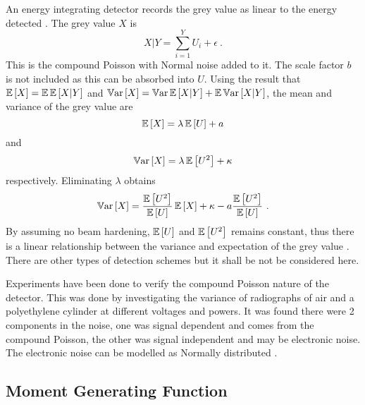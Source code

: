 An energy integrating detector records the grey value as linear to the energy detected \citep{whiting2006properties}. The grey value $X$ is
\begin{equation}
X|Y = \sum_{i=1}^Y U_i + \epsilon \ .
\end{equation}
This is the compound Poisson with Normal noise added to it. The scale factor $b$ is not included as this can be absorbed into $U$. Using the result that $\operatorname{\mathbb{E}}\left[X\right]=\operatorname{\mathbb{E}}\operatorname{\mathbb{E}}\left[X|Y\right]$ and $\operatorname{\mathbb{V}ar}\left[X\right] = \operatorname{\mathbb{V}ar}\operatorname{\mathbb{E}}\left[X|Y\right] + \operatorname{\mathbb{E}}\operatorname{\mathbb{V}ar}\left[X|Y\right]$, the mean and variance of the grey value are
\begin{equation}
\operatorname{\mathbb{E}}\left[X\right] = \lambda\operatorname{\mathbb{E}}\left[U\right]+a
\end{equation}
and
\begin{equation}
\operatorname{\mathbb{V}ar}\left[X\right] = \lambda \operatorname{\mathbb{E}}\left[U^2\right]+\kappa
\end{equation}
respectively. Eliminating $\lambda$ obtains
\begin{equation}
\variance\left[X\right] = \dfrac{\expectation\left[U^2\right]}{\expectation\left[U\right]} \expectation\left[X\right] + \kappa - a\dfrac{\expectation\left[U^2\right]}{\expectation\left[U\right]} \ .
\end{equation}
By assuming no beam hardening, $\operatorname{\mathbb{E}}\left[U\right]$ and $\operatorname{\mathbb{E}}\left[U^2\right]$ remains constant, thus there is a linear relationship between the variance and expectation of the grey value \citep{yang2009evaluation}. There are other types of detection schemes \citep{whiting2006properties} but it shall be not be considered here.

Experiments have been done to verify the compound Poisson nature of the detector. This was done by investigating the variance of radiographs of air \citep{hsieh2015compound} and a polyethylene cylinder \citep{yang2009evaluation, yang2010noise} at different voltages and powers. It was found there were 2 components in the noise, one was signal dependent and comes from the compound Poisson, the other was signal independent and may be electronic noise. The electronic noise can be modelled as Normally distributed \citep{xu2009electronic}.

\subsection{Moment Generating Function}

